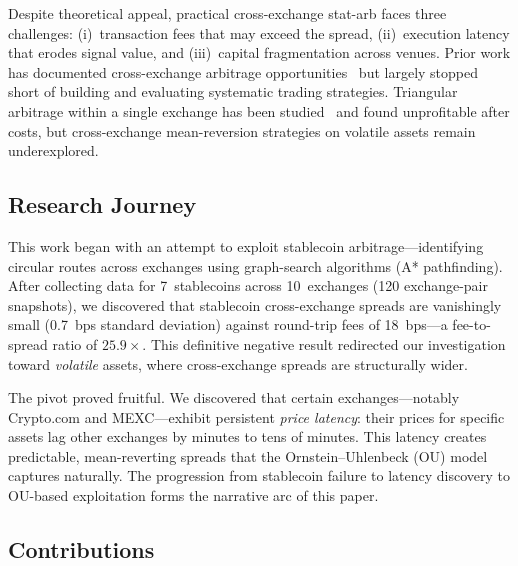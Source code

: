 \documentclass[sigconf,nonacm=false]{acmart}
\begin{document}
Despite theoretical appeal, practical cross-exchange stat-arb faces three challenges: (i)~transaction fees that may exceed the spread, (ii)~execution latency that erodes signal value, and (iii)~capital fragmentation across venues. Prior work has documented cross-exchange arbitrage opportunities~\cite{makarov2020trading, gandal2021key} but largely stopped short of building and evaluating systematic trading strategies. Triangular arbitrage within a single exchange has been studied~\cite{fischler2024wish} and found unprofitable after costs, but cross-exchange mean-reversion strategies on volatile assets remain underexplored.

\subsection{Research Journey}

This work began with an attempt to exploit stablecoin arbitrage---identifying circular routes across exchanges using graph-search algorithms (A* pathfinding). After collecting data for 7~stablecoins across 10~exchanges (120 exchange-pair snapshots), we discovered that stablecoin cross-exchange spreads are vanishingly small (0.7~bps standard deviation) against round-trip fees of 18~bps---a fee-to-spread ratio of $25.9\times$. This definitive negative result redirected our investigation toward \emph{volatile} assets, where cross-exchange spreads are structurally wider.

The pivot proved fruitful. We discovered that certain exchanges---notably Crypto.com and MEXC---exhibit persistent \emph{price latency}: their prices for specific assets lag other exchanges by minutes to tens of minutes. This latency creates predictable, mean-reverting spreads that the Ornstein--Uhlenbeck (OU) model captures naturally. The progression from stablecoin failure to latency discovery to OU-based exploitation forms the narrative arc of this paper.

\subsection{Contributions}
\end{document}
